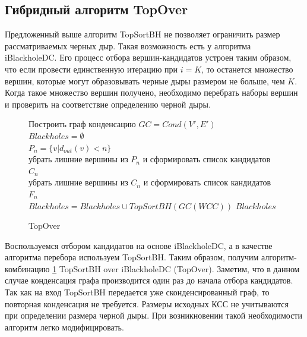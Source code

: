 \documentclass[12pt,a4paper,oneside,openany]{article}
\theoremstyle{definition}
\theoremstyle{lemma}
\theoremstyle{remark}
\begin{document}
\subsection{Гибридный алгоритм TopOver}\label{subsec:topover}

Предложенный выше алгоритм TopSortBH не позволяет ограничить размер рассматриваемых черных дыр.
Такая возможность есть у алгоритма iBlackholeDC. Его процесс отбора вершин-кандидатов устроен таким
образом, что если провести единственную итерацию при $i=K$, то останется множество вершин,
которые могут образовывать черные дыры размером не больше, чем $K$. Когда такое множество
вершин получено, необходимо перебрать наборы вершин и проверить на соответствие
определению черной дыры.

\linespread{1.0}
\begin{figure}[H]
	\begin{center}
		\begin{algorithm}[H]
			\SetAlgoLined
                        Построить граф конденсацию $GC = Cond(V',E')$ \\
                        $Blackholes = \emptyset$ \\
                        $P_n = \{v | d_{out}(v) < n\}$ \\
                        убрать лишние вершины из $P_n$ и сформировать список кандидатов $C_n$ \\
                        убрать лишние вершины из $C_n$ и сформировать список кандидатов $F_n$ \\
                         {
                            $Blackholes = Blackholes \cup TopSortBH(GC(WCC))$
                        }
                        \Return $Blackholes$
			\label{alg:topover}
			\caption{TopOver}
		\end{algorithm}
	\end{center}
\end{figure}
\linespread{1.5}

Воспользуемся отбором кандидатов на основе iBlackholeDC, а в качестве алгоритма перебора используем TopSortBH.
Таким образом, получим алгоритм-комбинацию \ref{alg:topover} TopSortBH over iBlackholeDC (TopOver).
Заметим, что в данном случае конденсация графа производится один раз до начала отбора кандидатов.
Так как на вход TopSortBH передается уже сконденсированный граф, то повторная конденсация не требуется.
Размеры исходных КСС не учитываются при определении размера черной дыры. При возникновении такой необходимости
алгоритм легко модифицировать.
\end{document}
